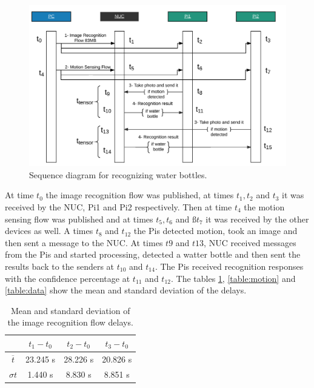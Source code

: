 \begin{figure}[H]
	\centering
	\includegraphics[scale=0.45]{images/sequence-diagram.png}
	\caption{Sequence diagram for recognizing water bottles.}
	\label{fig:sd-tensor}
\end{figure} 
 


\noindent At time $t_0$ the image recognition flow was published, at times $t_1, t_2$ and   $t_3$ it was received by the NUC, Pi1 and Pi2 respectively. Then at time $t_4$ the motion sensing flow was published and at times $t_5,t_6$ and $ßt_7$ it was received by the other devices as well. A times $t_8$ and $t_{12}$  the Pis detected motion, took an image and then sent a message to the NUC. At times $t9$ and $t{13}$,  NUC received messages from the Pis and started processing, detected a watter bottle and then sent the  results back to the senders at $t_{10}$ and $t_{14}$. The Pis received recognition responses with the confidence percentage at $t_{11}$ and $t_{12}$.  The tables \ref{table:tensor}, \ref{table:motion} and \ref{table:data} show the mean and standard deviation of the delays.  
\begin{table}[H]
\centering
\begin{tabular}{c|c|c|c}\toprule
&$t_1 - t_0$  & $t_2 - t_0$  & $t_3-t_0$ \\ \midrule
$ \overline{t} $&	23.245 s&28.226 s&20.826 s\\ 
$ \sigma t $ &1.440 s&8.830 s&8.851 s\\
\end{tabular}
\caption{Mean and standard deviation of the image recognition flow delays.}
\label{table:tensor}
\end{table}


